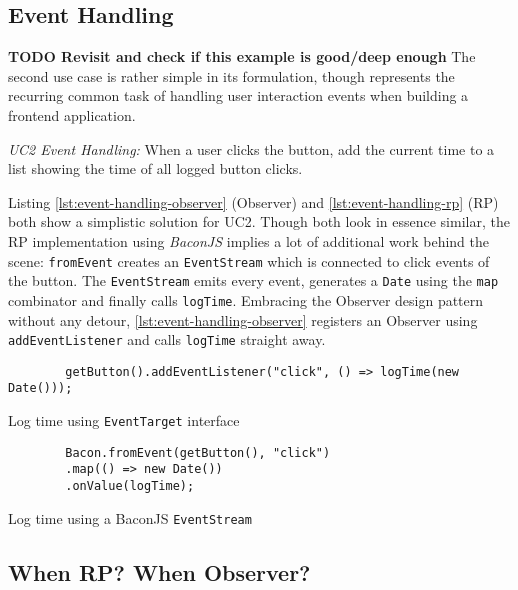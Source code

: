 \documentclass[12pt,a4paper]{article}
\begin{document}
\subsection{Event Handling}

\textbf{TODO Revisit and check if this example is good/deep enough} The second use case is rather simple in its formulation, though represents the recurring common task of handling user interaction events when building a frontend application.

\begin{framed}
	\noindent\emph{UC2 Event Handling:} When a user clicks the button, add the current time to a list showing the time of all logged button clicks.
\end{framed}

Listing \ref{lst:event-handling-observer} (Observer) and \ref{lst:event-handling-rp} (RP) both show a simplistic solution for UC2. Though both look in essence similar, the RP implementation using \emph{BaconJS} implies a lot of additional work behind the scene: \texttt{fromEvent} creates an \texttt{EventStream} which is connected to click events of the button. The \texttt{EventStream} emits every event, generates a \texttt{Date} using the \texttt{map} combinator and finally calls \texttt{logTime}. Embracing the Observer design pattern without any detour, \ref{lst:event-handling-observer} registers an Observer using \texttt{addEventListener} and calls \texttt{logTime} straight away.

\begin{listing}
	\begin{verbatim}
		getButton().addEventListener("click", () => logTime(new Date()));
	\end{verbatim}
	\caption{Log time using \texttt{EventTarget} interface}
	\label{lst:event-handling-observer}
\end{listing}

\begin{listing}
	\begin{verbatim}
		Bacon.fromEvent(getButton(), "click")
		.map(() => new Date())
		.onValue(logTime);
	\end{verbatim}
	\caption{Log time using a BaconJS \texttt{EventStream}}
	\label{lst:event-handling-rp}
\end{listing}


\subsection{When RP? When Observer?}
\label{sec:when-rp-when-observer}
\end{document}
